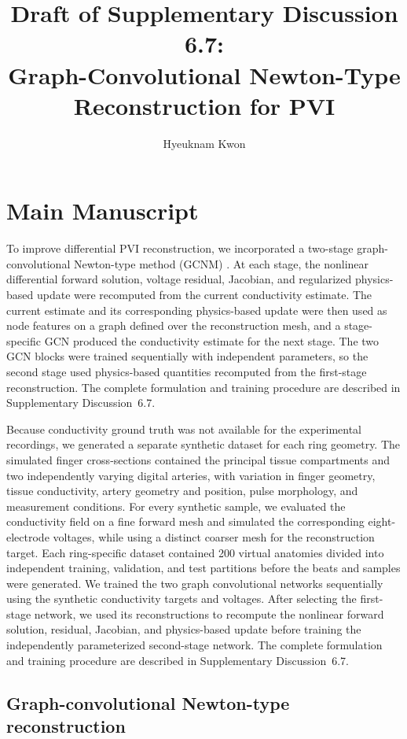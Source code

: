 \documentclass[11pt]{article}
\title{Draft of Supplementary Discussion 6.7:\\
Graph-Convolutional Newton-Type Reconstruction for PVI}
\author{Hyeuknam Kwon}
\date{}
\begin{document}
\section*{Main Manuscript}
\begingroup
To improve differential PVI reconstruction, we incorporated a two-stage graph-convolutional Newton-type method (GCNM) \cite{Herzberg2021GCNM}.
At each stage, the nonlinear differential forward solution, voltage residual, Jacobian, and regularized physics-based update were recomputed from the current conductivity estimate.
The current estimate and its corresponding physics-based update were then used as node features on a graph defined over the reconstruction mesh, and a stage-specific GCN produced the conductivity estimate for the next stage.
The two GCN blocks were trained sequentially with independent parameters, so the second stage used physics-based quantities recomputed from the first-stage reconstruction.
The complete formulation and training procedure are described in Supplementary Discussion~6.7.


Because conductivity ground truth was not available for the experimental recordings, we generated a separate synthetic dataset for each ring geometry.
The simulated finger cross-sections contained the principal tissue compartments and two independently varying digital arteries, with variation in finger geometry, tissue conductivity, artery geometry and position, pulse morphology, and measurement conditions.
For every synthetic sample, we evaluated the conductivity field on a fine forward mesh and simulated the corresponding eight-electrode voltages, while using a distinct coarser mesh for the reconstruction target.
Each ring-specific dataset contained 200 virtual anatomies divided into independent training, validation, and test partitions before the beats and samples were generated.
We trained the two graph convolutional networks sequentially using the synthetic conductivity targets and voltages.
After selecting the first-stage network, we used its reconstructions to recompute the nonlinear forward solution, residual, Jacobian, and physics-based update before training the independently parameterized second-stage network.
The complete formulation and training procedure are described in Supplementary Discussion~6.7.
\endgroup

\newpage

\setcounter{section}{6}
\setcounter{subsection}{6}
\setcounter{equation}{16}
\subsection{Graph-convolutional Newton-type reconstruction}
\label{sec:pvi_gcnm}
\end{document}
